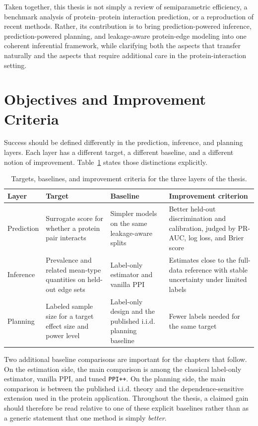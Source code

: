 Taken together, this thesis is not simply a review of semiparametric efficiency, a benchmark analysis of protein--protein interaction prediction, or a reproduction of recent methods. Rather, its contribution is to bring prediction-powered inference, prediction-powered planning, and leakage-aware protein-edge modeling into one coherent inferential framework, while clarifying both the aspects that transfer naturally and the aspects that require additional care in the protein-interaction setting.

\section{Objectives and Improvement Criteria}

Success should be defined differently in the prediction, inference, and planning layers. Each layer has a different target, a different baseline, and a different notion of improvement. Table~\ref{tab:intro_objectives} states those distinctions explicitly.

\begin{table}[h!]
    \centering
    \small
    \setlength{\tabcolsep}{5pt}
    \renewcommand{\arraystretch}{1.15}
    \begin{tabular}{@{}p{}p{}p{}p{}@{}}
    \toprule
    Layer & Target & Baseline & Improvement criterion \\
    \midrule
    Prediction & Surrogate score for whether a protein pair interacts & Simpler models on the same leakage-aware splits & Better held-out discrimination and calibration, judged by PR-AUC, log loss, and Brier score \\
    Inference & Prevalence and related mean-type quantities on held-out edge sets & Label-only estimator and vanilla PPI & Estimates close to the full-data reference with stable uncertainty under limited labels \\
    Planning & Labeled sample size for a target effect size and power level & Label-only design and the published i.i.d. planning baseline & Fewer labels needed for the same target \\
    \bottomrule
    \end{tabular}
    \caption[Targets, baselines, and improvement criteria]{Targets, baselines, and improvement criteria for the three layers of the thesis.}
    \label{tab:intro_objectives}
    \end{table}

Two additional baseline comparisons are important for the chapters that follow. On the estimation side, the main comparison is among the classical label-only estimator, vanilla PPI, and tuned \texttt{PPI++}. On the planning side, the main comparison is between the published i.i.d. theory and the dependence-sensitive extension used in the protein application. Throughout the thesis, a claimed gain should therefore be read relative to one of these explicit baselines rather than as a generic statement that one method is simply \emph{better}.

